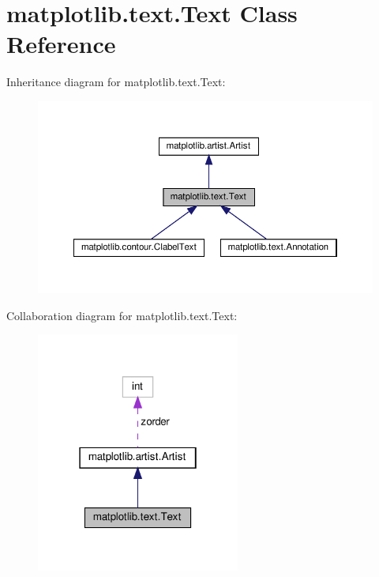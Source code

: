 \hypertarget{classmatplotlib_1_1text_1_1Text}{}\section{matplotlib.\+text.\+Text Class Reference}
\label{classmatplotlib_1_1text_1_1Text}


Inheritance diagram for matplotlib.\+text.\+Text\+:
\nopagebreak
\begin{figure}[H]
\begin{center}
\leavevmode
\includegraphics[width=350pt]{classmatplotlib_1_1text_1_1Text__inherit__graph}
\end{center}
\end{figure}


Collaboration diagram for matplotlib.\+text.\+Text\+:
\nopagebreak
\begin{figure}[H]
\begin{center}
\leavevmode
\includegraphics[width=190pt]{classmatplotlib_1_1text_1_1Text__coll__graph}
\end{center}
\end{figure}
